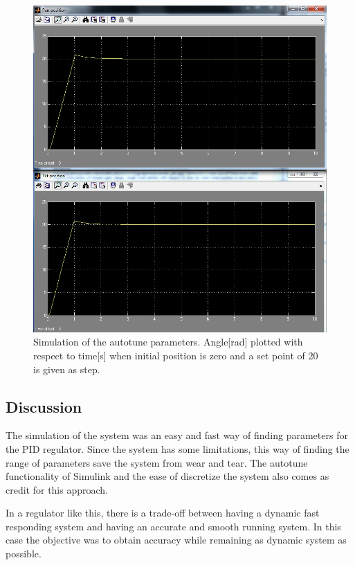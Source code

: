 \begin{figure}[htb]
	\centering
	\includegraphics[width=\textwidth,trim=0 0 0 0]{graphics/screensh_pid.jpg} %
	\caption{Simulation of the autotune parameters. Angle[rad] plotted with respect to time[s] when initial position is zero and a set point of 20 is given as step.}
	\label{fig:chosen_plot}			%
\end{figure}

\subsection{Discussion}
The simulation of the system was an easy and fast way of finding parameters for the PID regulator. Since the system has some limitations, this way of finding the range of parameters save the system from wear and tear. The autotune functionality of Simulink and the ease of discretize the system also comes as credit for this approach.

In a regulator like this, there is a trade-off between having a dynamic fast responding system and having an accurate and smooth running system. In this case the objective was to obtain accuracy while remaining as dynamic system as possible.

